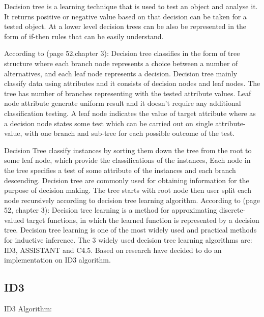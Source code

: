 \documentclass{article}
\begin{document}
Decision tree is a learning technique that is used to test an object and analyse it. It returns positive or negative value based on that decision can be taken for a tested object. At a lower level decision trees can be also be represented in the form of if-then rules that can be easily understand.

According to \cite{Mitchell1997MachineLearning}(page 52,chapter 3): Decision tree classifies in the form of tree structure where each branch node represents a choice between a number of alternatives, and each leaf node represents a decision. Decision tree mainly classify data using attributes and it consists of decision nodes and leaf nodes. The tree has number of branches representing with the tested attribute values. Leaf node attribute generate uniform result and it doesn't require any additional classification testing. A leaf node indicates the value of target attribute where as a decision node states some test which can be carried out on single attribute-value, with one branch and sub-tree for each possible outcome of the test.

Decision Tree classify instances by sorting them down the tree from the root to some leaf node, which provide the classifications of the instances, Each node in the tree specifies a test of some attribute of the instances and each branch descending.
Decision tree are commonly used for obtaining information for the purpose of decision making. The tree starts with root node then user split each node recursively according to decision tree learning algorithm.
According to \cite{Mitchell1997MachineLearning}(page 52, chapter 3): Decision tree learning is a method for approximating discrete-valued target functions, in which the learned function is represented by a decision tree. Decision tree learning is one of the most widely used and practical methods for inductive inference. The 3 widely used decision tree learning algorithms are: ID3, ASSISTANT and C4.5. Based on research have decided to do an implementation on ID3 algorithm. 


\subsection{ID3}
\label{sec:ID3}

ID3 Algorithm:
\end{document}
